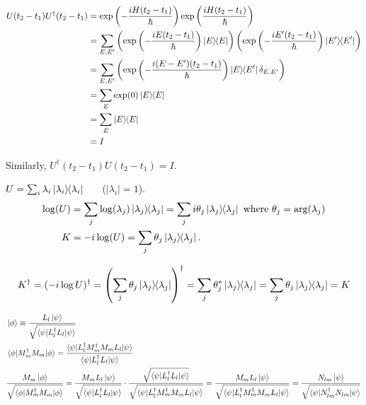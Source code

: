 \begin{align*}
	U(t_2 - t_1) U^\dagger (t_2 - t_1) &= \exp \left( - \frac{iH(t_2 - t_1)}{\hbar} \right)  \exp \left(  \frac{iH(t_2 - t_1)}{\hbar} \right)\\
		&= \sum_{E, E'} \left(\exp \left(- \frac{iE(t_2 - t_1)}{\hbar} \right) \ket{E}\hspace{-1mm} \bra{E} \right)
										\left(\exp \left(- \frac{iE'(t_2 - t_1)}{\hbar} \right) \ket{E'}\hspace{-1mm} \bra{E'} \right)\\
		&= \sum_{E, E'} \left(\exp \left(- \frac{i(E-E')(t_2 - t_1)}{\hbar} \right) \ket{E}\hspace{-1mm} \bra{E'} \delta_{E,E'} \right) \\
		&= \sum_E \exp(0) \ket{E}\hspace{-1mm} \bra{E}\\
		&= \sum_E \ket{E}\hspace{-1mm} \bra{E}\\
		&= I
\end{align*}

Similarly, $U^\dagger (t_2 - t_1) U (t_2 - t_1) = I$.




$U = \sum_i \lambda_i \ket{\lambda_i}\hspace{-1mm} \bra{\lambda_i}$~~~ ($|\lambda_i| = 1$).
\begin{align*}
	\log (U) &= \sum_j \log (\lambda_j) \ket{\lambda_j}\hspace{-1mm} \bra{\lambda_j} = \sum_j i \theta_j  \ket{\lambda_j}\hspace{-1mm} \bra{\lambda_j} \text{ where } \theta_j = \arg (\lambda_j)\\
	K &= - i \log(U) = \sum_j \theta_j \ket{\lambda_j}\hspace{-1mm} \bra{\lambda_j}.
\end{align*}

\begin{align*}
	K^\dagger = (-i \log U)^\dagger = \left(\sum_j \theta_j \ket{\lambda_j}\hspace{-1mm} \bra{\lambda_j}\right)^\dagger
	= \sum_j \theta_j^* \ket{\lambda_j}\hspace{-1mm} \bra{\lambda_j} = \sum_j \theta_j \ket{\lambda_j}\hspace{-1mm} \bra{\lambda_j} = K
\end{align*}



\begin{align*}
	&\ket{\phi} \equiv \frac{L_l \ket{\psi}}{\sqrt{\braket{\psi |L_l^\dagger L_l | \psi}}}\\
	&\braket{\phi | M_m^\dagger M_m | \phi} = \frac{\braket{\psi | L_l^\dagger M_m^\dagger M_m L_l | \psi}}{\braket{\psi | L_l^\dagger L_l | \psi}} \\
%
	&\frac{M_m \ket{\phi}}{\sqrt{\braket{\phi | M_m^\dagger M_m | \phi}}} =
		\frac{M_m L_l \ket{\psi}}{\sqrt{\braket{\psi |L_l^\dagger L_l | \psi}}}
		\cdot
		\frac{ \sqrt{\braket{\psi | L_l^\dagger L_l | \psi}} }{ \sqrt{\braket{\psi | L_l^\dagger M_m^\dagger M_m L_l | \psi}} }
		=
		\frac{M_m L_l \ket{\psi}}{ \sqrt{\braket{\psi | L_l^\dagger M_m^\dagger M_m L_l | \psi}} }
		=
		\frac{N_{lm} \ket{\psi}}{\sqrt{\braket{\psi |N^\dagger_{lm}  N_{lm}  | \psi}}}
\end{align*}



